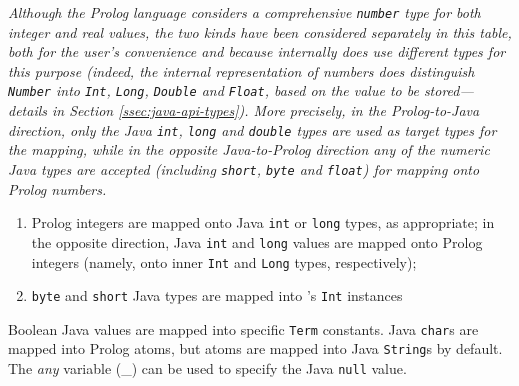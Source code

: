 \textit{Although the Prolog language considers a comprehensive \texttt{number} type for both integer and real values, the two kinds have been considered separately in this table, both for the user's convenience and because \tuprolog{} internally does use different types for this purpose (indeed, the \tuprolog{} internal representation of numbers does distinguish \texttt{Number} into \texttt{Int}, \texttt{Long}, \texttt{Double} and \texttt{Float}, based on the value to be stored---details in Section \ref{ssec:java-api-types}).
%
More precisely, in the Prolog-to-Java direction, only the Java \texttt{int}, \texttt{long} and \texttt{double} types are used as target types for the mapping, while in the opposite Java-to-Prolog direction any of the numeric Java types are accepted (including \texttt{short}, \texttt{byte} and \texttt{float}) for mapping onto Prolog numbers.
}

\begin{enumerate}
  \item Prolog integers are mapped onto Java \texttt{int} or \texttt{long} types, as appropriate; in the opposite direction, Java \texttt{int} and \texttt{long} values are mapped onto Prolog integers (namely, onto \tuprolog{} inner \texttt{Int} and \texttt{Long} types, respectively);
  \item \texttt{byte} and \texttt{short} Java types are mapped into \tuprolog{}'s \texttt{Int} instances
\end{enumerate}

Boolean Java values are mapped into specific \tuprolog{} \texttt{Term} constants.
%
Java \texttt{char}s are mapped into Prolog atoms, but atoms are
mapped into Java \texttt{String}s by default.
%
The \emph{any} variable (\_) can be used to specify the Java
\texttt{null} value.


